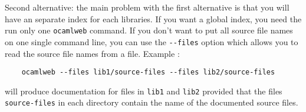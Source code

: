 \documentclass[12pt]{article}
\begin{document}
\begin{enumerate}
  Second alternative: the main problem with the first alternative is
  that you will have an separate index for each libraries. If you want
  a global index, you need the run only one \verb|ocamlweb| command.
  If you don't want to put all source file names on one single command
  line, you can use the \verb|--files| option which allows you to read
  the source file names from a file. Example :
\begin{verbatim}
    ocamlweb --files lib1/source-files --files lib2/source-files
\end{verbatim}
  will produce documentation for files in \verb|lib1| and \verb|lib2|
  provided that the files \verb|source-files| in each directory
  contain the name of the documented source files.

\end{enumerate}



\end{document}
